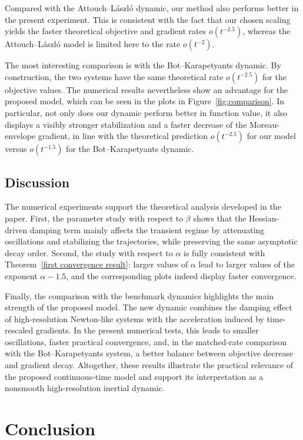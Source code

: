 \documentclass[11pt]{article}
\numberwithin{equation}{section}
\begin{document}
Compared with the Attouch--L\'aszl\'o dynamic, our method also performs better in the present experiment. This is consistent with the fact that our chosen scaling yields the faster theoretical objective and gradient rates \(o(t^{-2.5})\), whereas the Attouch--L\'aszl\'o model is limited here to the rate \(o(t^{-2})\).

The most interesting comparison is with the Bot--Karapetyants dynamic. By construction, the two systems have the same theoretical rate \(o(t^{-2.5})\) for the objective values. The numerical results nevertheless show an advantage for the proposed model, which can be seen in the plots in Figure~\ref{fig:comparison}. In particular, not only does our dynamic perform better in function value, it also displays a visibly stronger stabilization and a faster decrease of the Moreau-envelope gradient, in line with the theoretical prediction \(o(t^{-2.5})\) for our model versus \(o(t^{-1.5})\) for the Bot--Karapetyants dynamic.

\subsection{Discussion}

The numerical experiments support the theoretical analysis developed in the paper. First, the parameter study with respect to \(\beta\) shows that the Hessian-driven damping term mainly affects the transient regime by attenuating oscillations and stabilizing the trajectories, while preserving the same asymptotic decay order. Second, the study with respect to \(\alpha\) is fully consistent with Theorem~\ref{first convergence result}: larger values of \(\alpha\) lead to larger values of the exponent \(\alpha-1.5\), and the corresponding plots indeed display faster convergence.

Finally, the comparison with the benchmark dynamics highlights the main strength of the proposed model. The new dynamic combines the damping effect of high-resolution Newton-like systems with the acceleration induced by time-rescaled gradients. In the present numerical tests, this leads to smaller oscillations, faster practical convergence, and, in the matched-rate comparison with the Bot--Karapetyants system, a better balance between objective decrease and gradient decay. Altogether, these results illustrate the practical relevance of the proposed continuous-time model and support its interpretation as a nonsmooth high-resolution inertial dynamic.

\section{Conclusion}
\end{document}
